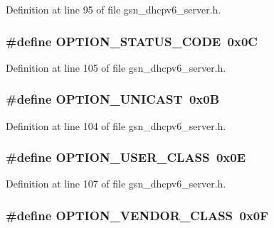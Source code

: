 Definition at line 95 of file gsn\_\-dhcpv6\_\-server.h.

\hypertarget{a00483_a1472aead1468caf555218588d11ec94c}{
\subsubsection[{OPTION\_\-STATUS\_\-CODE}]{\setlength{\rightskip}{0pt plus 5cm}\#define OPTION\_\-STATUS\_\-CODE~0x0C}}
\label{a00483_a1472aead1468caf555218588d11ec94c}


Definition at line 105 of file gsn\_\-dhcpv6\_\-server.h.

\hypertarget{a00483_adf64a1d484ee547882ca38c6b17db3c3}{
\subsubsection[{OPTION\_\-UNICAST}]{\setlength{\rightskip}{0pt plus 5cm}\#define OPTION\_\-UNICAST~0x0B}}
\label{a00483_adf64a1d484ee547882ca38c6b17db3c3}


Definition at line 104 of file gsn\_\-dhcpv6\_\-server.h.

\hypertarget{a00483_acd388b3fad92587c49a1ae26a1fea390}{
\subsubsection[{OPTION\_\-USER\_\-CLASS}]{\setlength{\rightskip}{0pt plus 5cm}\#define OPTION\_\-USER\_\-CLASS~0x0E}}
\label{a00483_acd388b3fad92587c49a1ae26a1fea390}


Definition at line 107 of file gsn\_\-dhcpv6\_\-server.h.

\hypertarget{a00483_ab556f01905f90dfb043de286a2e5a67e}{
\subsubsection[{OPTION\_\-VENDOR\_\-CLASS}]{\setlength{\rightskip}{0pt plus 5cm}\#define OPTION\_\-VENDOR\_\-CLASS~0x0F}}
\label{a00483_ab556f01905f90dfb043de286a2e5a67e}


